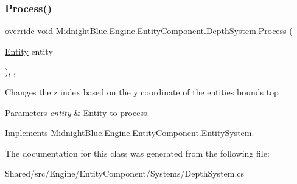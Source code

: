 \subsubsection{\texorpdfstring{Process()}{Process()}}
{\footnotesize\ttfamily override void Midnight\+Blue.\+Engine.\+Entity\+Component.\+Depth\+System.\+Process (\begin{DoxyParamCaption}\item[{\hyperlink{class_midnight_blue_1_1_engine_1_1_entity_component_1_1_entity}{Entity}}]{entity }\end{DoxyParamCaption})\hspace{0.3cm}{\ttfamily [inline]}, {\ttfamily [protected]}, {\ttfamily [virtual]}}



Changes the z index based on the y coordinate of the entities bounds top 


\begin{DoxyParams}{Parameters}
{\em entity} & \hyperlink{class_midnight_blue_1_1_engine_1_1_entity_component_1_1_entity}{Entity} to process.\\
\hline
\end{DoxyParams}


Implements \hyperlink{class_midnight_blue_1_1_engine_1_1_entity_component_1_1_entity_system_a94aa715ac6bfe9a720c3d12d56c7598c}{Midnight\+Blue.\+Engine.\+Entity\+Component.\+Entity\+System}.



The documentation for this class was generated from the following file\+:\begin{DoxyCompactItemize}
\item 
Shared/src/\+Engine/\+Entity\+Component/\+Systems/Depth\+System.\+cs\end{DoxyCompactItemize}
